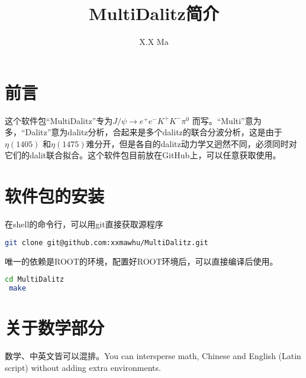 \documentclass[11pt,a4paper]{article}
\title{MultiDalitz简介}
\author{X.X Ma}
\begin{document}
\begin{CJK*}{UTF8}{gbsn}
\maketitle
\section{前言}
这个软件包“MultiDalitz”专为$J/\psi \to e^{+} e^{-} K^{+} K^{-} \pi^{0}$ 而写。“Multi”意为多，“Dalitz”意为dalitz分析，合起来是多个dalitz的联合分波分析，这是由于$\eta(1405)$ 和$\eta(1475)$难分开，但是各自的dalitz动力学又迥然不同，必须同时对它们的dalit联合拟合。这个软件包目前放在GitHub上，可以任意获取使用。
\section{软件包的安装}
在shell的命令行，可以用git直接获取源程序
\begin{lstlisting}[language=bash] 
 git clone git@github.com:xxmawhu/MultiDalitz.git 
\end{lstlisting}
唯一的依赖是ROOT的环境，配置好ROOT环境后，可以直接编译后使用。
\begin{lstlisting}[language=bash] 
 cd MultiDalitz
 make
\end{lstlisting}
\section{关于数学部分}
数学、中英文皆可以混排。You can intersperse math, Chinese and English (Latin script) without adding extra environments.

\end{CJK*}
\end{document}
